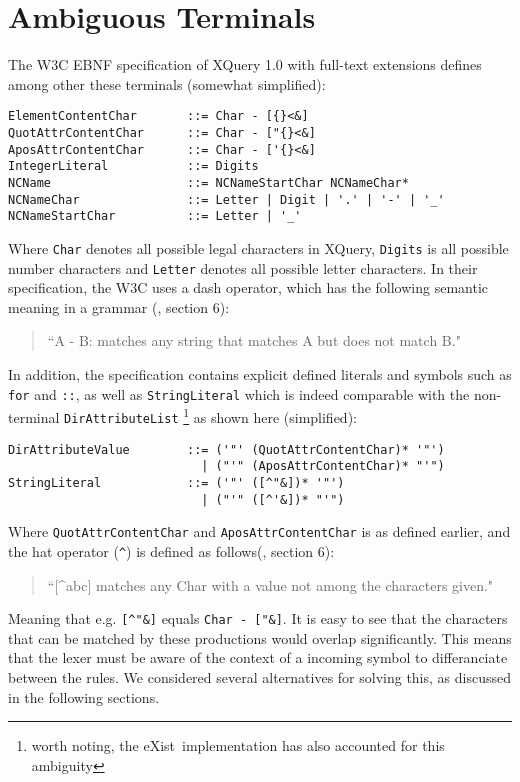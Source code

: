 \section{Ambiguous Terminals}
\label{sect:ambiguousgrammar:ambigTerm}
The W3C EBNF specification of XQuery 1.0 with full-text extensions\cite{w3c01} defines among other these terminals (somewhat simplified):
\begin{Verbatim}
ElementContentChar       ::= Char - [{}<&]
QuotAttrContentChar      ::= Char - ["{}<&]
AposAttrContentChar      ::= Char - ['{}<&]
IntegerLiteral           ::= Digits
NCName                   ::= NCNameStartChar NCNameChar*
NCNameChar               ::= Letter | Digit | '.' | '-' | '_'
NCNameStartChar          ::= Letter | '_'
\end{Verbatim}
Where \verb!Char! denotes all possible legal characters in XQuery, \verb!Digits! is all possible number characters and \verb!Letter! denotes all possible letter characters. In their specification, the W3C uses a dash operator, which has the following
semantic meaning in a grammar (\cite{w3c03}, section 6):
\begin{quote}
``A - B: matches any string that matches A but does not match B."
\end{quote}
In addition, the specification contains explicit defined literals and symbols
such as \verb!for! and \verb!::!, as well as \verb!StringLiteral! which is
indeed comparable with the non-terminal \verb!DirAttributeList! \footnote{worth
noting, the eXist\cite{exist_doc}~implementation has also accounted for this
ambiguity} as shown here (simplified):
\begin{Verbatim}
DirAttributeValue        ::= ('"' (QuotAttrContentChar)* '"')
                           | ("'" (AposAttrContentChar)* "'")
StringLiteral            ::= ('"' ([^"&])* '"') 
                           | ("'" ([^'&])* "'")
\end{Verbatim}
Where \verb!QuotAttrContentChar! and \verb!AposAttrContentChar! is as defined earlier, and the hat operator (\verb!^!) is defined as follows(\cite{w3c03}, section 6):
\begin{quote}
``[\^{}abc] matches any Char with a value not among the characters given."
\end{quote}
Meaning that e.g. \verb![^"&]! equals \verb!Char - ["&]!. It is easy to see that the characters that can be matched by these productions would overlap significantly. This means that the lexer must be aware of the context of a incoming symbol to differanciate between the rules. We considered several alternatives for solving this, as discussed in the following sections.

